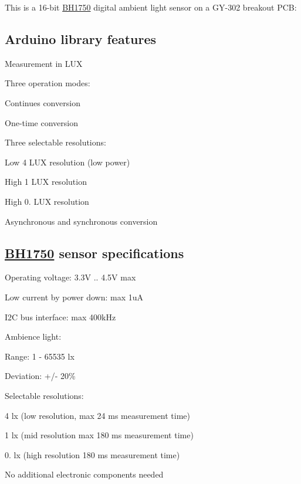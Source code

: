 \href{https://travis-ci.org/Erriez/ErriezBH1750}{\tt }

This is a 16-\/bit \hyperlink{class_b_h1750}{B\+H1750} digital ambient light sensor on a G\+Y-\/302 breakout P\+CB\+:



\subsection*{Arduino library features}


\begin{DoxyItemize}
\item Measurement in L\+UX
\item Three operation modes\+:
\begin{DoxyItemize}
\item Continues conversion
\item One-\/time conversion
\end{DoxyItemize}
\item Three selectable resolutions\+:
\begin{DoxyItemize}
\item Low 4 L\+UX resolution (low power)
\item High 1 L\+UX resolution
\item High 0. L\+UX resolution
\end{DoxyItemize}
\item Asynchronous and synchronous conversion
\end{DoxyItemize}

\subsection*{\hyperlink{class_b_h1750}{B\+H1750} sensor specifications}


\begin{DoxyItemize}
\item Operating voltage\+: 3.\+3V .. 4.\+5V max
\item Low current by power down\+: max 1uA
\item I2C bus interface\+: max 400k\+Hz
\item Ambience light\+:
\begin{DoxyItemize}
\item Range\+: 1 -\/ 65535 lx
\item Deviation\+: +/-\/ 20\%
\item Selectable resolutions\+:
\begin{DoxyItemize}
\item 4 lx (low resolution, max 24 ms measurement time)
\item 1 lx (mid resolution max 180 ms measurement time)
\item 0. lx (high resolution 180 ms measurement time)
\end{DoxyItemize}
\end{DoxyItemize}
\item No additional electronic components needed
\end{DoxyItemize}

